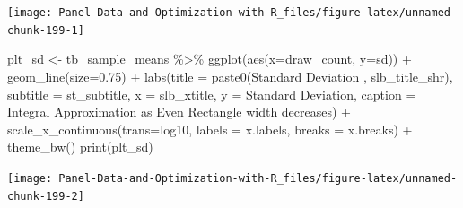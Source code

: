 \documentclass[
]{book}
\newenvironment{Shaded}{\begin{snugshade}}{\end{snugshade}}
\newcommand{\AttributeTok}[1]{\textcolor[rgb]{0.77,0.63,0.00}{#1}}
\newcommand{\FloatTok}[1]{\textcolor[rgb]{0.00,0.00,0.81}{#1}}
\newcommand{\FunctionTok}[1]{\textcolor[rgb]{0.00,0.00,0.00}{#1}}
\newcommand{\NormalTok}[1]{#1}
\newcommand{\OtherTok}[1]{\textcolor[rgb]{0.56,0.35,0.01}{#1}}
\newcommand{\SpecialCharTok}[1]{\textcolor[rgb]{0.00,0.00,0.00}{#1}}
\newcommand{\StringTok}[1]{\textcolor[rgb]{0.31,0.60,0.02}{#1}}
\begin{document}
\begin{center}\texttt{[image: Panel-Data-and-Optimization-with-R\_files/figure-latex/unnamed-chunk-199-1]} \end{center}

\begin{Shaded}
\begin{Highlighting}[]
\NormalTok{plt\_sd }\OtherTok{\textless{}{-}}\NormalTok{ tb\_sample\_means }\SpecialCharTok{\%\textgreater{}\%}
  \FunctionTok{ggplot}\NormalTok{(}\FunctionTok{aes}\NormalTok{(}\AttributeTok{x=}\NormalTok{draw\_count, }\AttributeTok{y=}\NormalTok{sd)) }\SpecialCharTok{+}
  \FunctionTok{geom\_line}\NormalTok{(}\AttributeTok{size=}\FloatTok{0.75}\NormalTok{) }\SpecialCharTok{+}
  \FunctionTok{labs}\NormalTok{(}\AttributeTok{title =} \FunctionTok{paste0}\NormalTok{(}\StringTok{\textquotesingle{}Standard Deviation \textquotesingle{}}\NormalTok{, slb\_title\_shr),}
       \AttributeTok{subtitle =}\NormalTok{ st\_subtitle,}
       \AttributeTok{x =}\NormalTok{ slb\_xtitle,}
       \AttributeTok{y =} \StringTok{\textquotesingle{}Standard Deviation\textquotesingle{}}\NormalTok{,}
       \AttributeTok{caption =} \StringTok{\textquotesingle{}Integral Approximation as Even Rectangle width decreases\textquotesingle{}}\NormalTok{) }\SpecialCharTok{+}
  \FunctionTok{scale\_x\_continuous}\NormalTok{(}\AttributeTok{trans=}\StringTok{\textquotesingle{}log10\textquotesingle{}}\NormalTok{, }\AttributeTok{labels =}\NormalTok{ x.labels, }\AttributeTok{breaks =}\NormalTok{ x.breaks) }\SpecialCharTok{+}
  \FunctionTok{theme\_bw}\NormalTok{()}
\FunctionTok{print}\NormalTok{(plt\_sd)}
\end{Highlighting}
\end{Shaded}

\begin{center}\texttt{[image: Panel-Data-and-Optimization-with-R\_files/figure-latex/unnamed-chunk-199-2]} \end{center}
\end{document}
